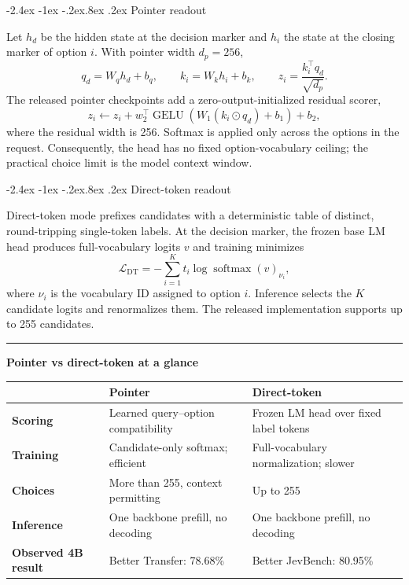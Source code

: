 \documentclass[10pt]{article}
\makeatletter
\renewcommand\subsection{\@startsection{subsection}{2}{\z@}%
  {-2.4ex \@plus -1ex \@minus -.2ex}{.8ex \@plus .2ex}%
  {\color{blue}\large\bfseries}}
\newenvironment{summarybox}{%
  \par\medskip\noindent\begin{center}\begin{minipage}{.94\linewidth}%
  \color{ink}\textcolor{blue}{\rule{3pt}{\baselineskip}}\hspace{7pt}%
}{\end{minipage}\end{center}\medskip}
\makeatother
\begin{document}
\subsection{Pointer readout}

Let $h_d$ be the hidden state at the decision marker and $h_i$ the state at the
closing marker of option $i$. With pointer width $d_p=256$,
\[
 q_d=W_qh_d+b_q,\qquad k_i=W_kh_i+b_k,\qquad
 z_i=\frac{k_i^\top q_d}{\sqrt{d_p}}.
\]
The released pointer checkpoints add a zero-output-initialized residual scorer,
\[
 z_i\leftarrow z_i+w_2^\top\operatorname{GELU}(W_1(k_i\odot q_d)+b_1)+b_2,
\]
where the residual width is 256. Softmax is applied only across the options in
the request. Consequently, the head has no fixed option-vocabulary ceiling; the
practical choice limit is the model context window.

\subsection{Direct-token readout}

Direct-token mode prefixes candidates with a deterministic table of distinct,
round-tripping single-token labels. At the decision marker, the frozen base LM
head produces full-vocabulary logits $v$ and training minimizes
\[
  \mathcal{L}_{\mathrm{DT}}=-\sum_{i=1}^{K}t_i
  \log\operatorname{softmax}(v)_{\nu_i},
\]
where $\nu_i$ is the vocabulary ID assigned to option $i$. Inference selects
the $K$ candidate logits and renormalizes them. The released implementation
supports up to 255 candidates.

\begin{summarybox}
\textbf{Pointer vs direct-token at a glance}\par\smallskip
\begin{tabular}{>{\bfseries}p{.18\linewidth}p{.36\linewidth}p{.36\linewidth}}
\toprule
 & Pointer & Direct-token \\
\midrule
Scoring & Learned query--option compatibility & Frozen LM head over fixed label tokens \\
Training & Candidate-only softmax; efficient & Full-vocabulary normalization; slower \\
Choices & More than 255, context permitting & Up to 255 \\
Inference & One backbone prefill, no decoding & One backbone prefill, no decoding \\
Observed 4B result & Better Transfer: 78.68\% & Better JevBench: 80.95\% \\
\bottomrule
\end{tabular}
\end{summarybox}
\end{document}
